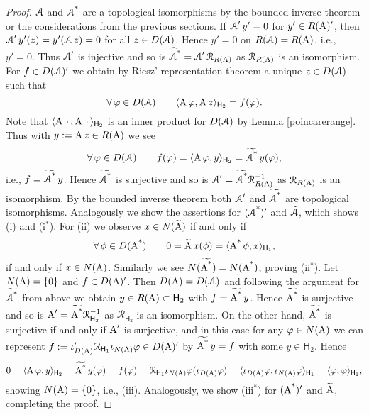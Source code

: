\documentclass[a4paper]{amsart}
\renewcommand{\H}{\mathsf{H}}
\renewcommand{\R}{\mathcal{R}}
\begin{document}
\begin{proof}
$\operatorname{\mathcal{A}}$ and $\operatorname{\operatorname{\mathcal{A}}^{*}}$ are a topological isomorphisms by the bounded inverse theorem
or the considerations from the previous sections. 
If $\operatorname{\mathcal{A}}'y'=0$ for $y'\in R(\operatorname{A})'$, then $\operatorname{\mathcal{A}}'y'(z)=y'(\operatorname{\mathcal{A}} z)=0$
for all $z\in D(\operatorname{\mathcal{A}})$. Hence $y'=0$ on $R(\operatorname{\mathcal{A}})=R(\operatorname{A})$, i.e., $y'=0$.
Thus $\operatorname{\mathcal{A}}'$ is injective and so is $\widetilde{\cAs}=\cA'\R_{R(\A)}$
as $\R_{R(\A)}$ is an isomorphism. 
For $f\in D(\operatorname{\mathcal{A}})'$ we obtain by Riesz' representation theorem
a unique $z\in D(\operatorname{\mathcal{A}})$ such that
$$\forall\,\varphi\in D(\cA)\qquad
\scp{\A\varphi}{\A z}_{\H_{2}}
=f(\varphi).$$
Note that $\scp{\A\,\cdot\,}{\A\,\cdot\,}_{\H_{2}}$
is an inner product for $D(\operatorname{\mathcal{A}})$ by Lemma \ref{poincarerange}.
Thus with $y:=\operatorname{A} z\in R(\operatorname{A})$ we see
$$\forall\,\varphi\in D(\cA)\qquad
f(\varphi)
=\scp{\A\varphi}{y}_{\H_{2}}
=\widetilde{\cAs}\,y(\varphi),$$
i.e., $f=\widetilde{\operatorname{\operatorname{\mathcal{A}}^{*}}}\,y$. Hence $\widetilde{\operatorname{\operatorname{\mathcal{A}}^{*}}}$ is surjective 
and so is $\cA'=\widetilde{\cAs}\R_{R(\A)}^{-1}$ as $\R_{R(\A)}$ is an isomorphism. 
By the bounded inverse theorem both $\operatorname{\mathcal{A}}'$ and $\widetilde{\operatorname{\operatorname{\mathcal{A}}^{*}}}$
are topological isomorphisms.
Analogously we show the assertions for
$(\operatorname{\operatorname{\mathcal{A}}^{*}})'$ and $\widetilde{\operatorname{\mathcal{A}}}$, which shows (i) and (i${}^{*}$).
For (ii) we observe $x\in N(\widetilde{\operatorname{A}})$ if and only if 
$$\forall\,\phi\in D(\As)\qquad
0=\widetilde{\A}\,x(\phi)
=\scp{\As\phi}{x}_{\H_{1}},$$
if and only if $x\in N(\operatorname{A})$. Similarly we see
$N(\widetilde{\operatorname{\operatorname{A}^{*}}})=N(\operatorname{\operatorname{A}^{*}})$, proving (ii${}^{*}$).
Let $N(\operatorname{A})=\{0\}$ and $f\in D(\operatorname{A})'$.
Then $D(\operatorname{A})=D(\operatorname{\mathcal{A}})$ and following the argument for $\widetilde{\operatorname{\operatorname{\mathcal{A}}^{*}}}$ from above
we obtain $y\in R(\A)\subset\H_{2}$ with $f=\widetilde{\operatorname{\operatorname{A}^{*}}}\,y$. 
Hence $\widetilde{\operatorname{\operatorname{A}^{*}}}$ is surjective 
and so is $\A'=\widetilde{\As}\R_{\H_{2}}^{-1}$ as $\R_{\H_{2}}$ is an isomorphism. 
On the other hand, $\widetilde{\operatorname{\operatorname{A}^{*}}}$ is surjective if and only if $\operatorname{A}'$ is surjective, 
and in this case for any $\varphi\in N(\operatorname{A})$
we can represent $f:=\iota_{D(\A)}'\R_{\H_{1}}\iota_{N(\A)}\varphi\in D(\A)'$ by
$\widetilde{\operatorname{\operatorname{A}^{*}}}\,y=f$ with some $y\in\H_{2}$. Hence
\begin{align*}
0=\scp{\A\varphi}{y}_{\H_{2}}
=\widetilde{\As}\,y(\varphi)
=f(\varphi)
=\R_{\H_{1}}\iota_{N(\A)}\varphi(\iota_{D(\A)}\varphi)
=\scp{\iota_{D(\A)}\varphi}{\iota_{N(\A)}\varphi}_{\H_{1}}
=\scp{\varphi}{\varphi}_{\H_{1}},
\end{align*}
showing $N(\operatorname{A})=\{0\}$, i.e., (iii).
Analogously, we show (iii${}^{*}$) for $(\operatorname{\operatorname{A}^{*}})'$ and $\widetilde{\operatorname{A}}$,
completing the proof.
\end{proof}
\end{document}
